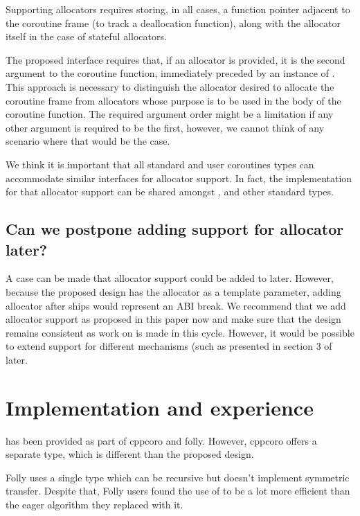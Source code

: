 \documentclass{wg21}
\begin{document}
Supporting allocators requires storing, in all cases, a function pointer adjacent to the coroutine frame (to track a deallocation function),
along with the allocator itself in the case of stateful allocators.

The proposed interface requires that, if an allocator is provided, it is the second argument to the coroutine function, 
immediately preceded by an instance of .
This approach is necessary to distinguish the allocator desired to allocate the coroutine frame from allocators whose purpose is to be used in the body of the coroutine function.
The required argument order might be a limitation if any other argument is required to be the first, however, we cannot think of any scenario where that would be the case.

We think it is important that all standard and user coroutines types can accommodate similar interfaces for allocator support.
In fact, the implementation for that allocator support can be shared amongst ,  and other standard types.

\subsection{Can we postpone adding support for allocator later?}

A case can be made that allocator support could be added to  later.
However, because the proposed design has the allocator as a template parameter, 
adding allocator after  ships would represent an ABI break.
We recommend that we add allocator support as proposed in this paper now and make sure that the design remains consistent as work on 
is made in this cycle.
However, it would be possible to extend support for different mechanisms (such as presented in section 3 of  later.

\section{Implementation and experience}

 has been provided as part of cppcoro and folly.
However, cppcoro offers a separate  type, which is different than the proposed design.

Folly uses a single  type which can be recursive but doesn't implement symmetric transfer. Despite that,
Folly users found the use of  to be a lot more efficient than the eager algorithm they replaced with it.
\end{document}
